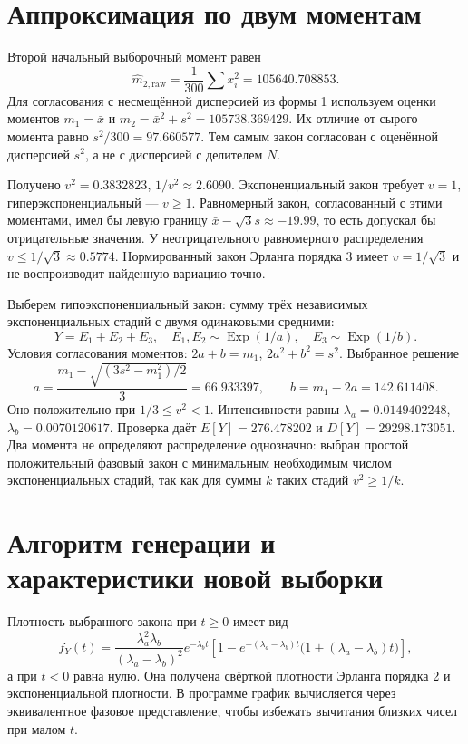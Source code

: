 \documentclass[11pt,a4paper]{article}
\begin{document}
\section{Аппроксимация по двум моментам}
Второй начальный выборочный момент равен
\[
\widehat m_{2,\mathrm{raw}}=\frac1{300}\sum x_i^2=105640.708853.
\]
Для согласования с несмещённой дисперсией из формы 1 используем оценки моментов $m_1=\bar x$ и $m_2=\bar x^2+s^2=105738.369429$. Их отличие от сырого момента равно $s^2/300=97.660577$. Тем самым закон согласован с оценённой дисперсией $s^2$, а не с дисперсией с делителем $N$.

Получено $v^2=0.3832823$, $1/v^2\approx2.6090$. Экспоненциальный закон требует $v=1$, гиперэкспоненциальный --- $v\geq1$. Равномерный закон, согласованный с этими моментами, имел бы левую границу $\bar x-\sqrt3s\approx-19.99$, то есть допускал бы отрицательные значения. У неотрицательного равномерного распределения $v\leq1/\sqrt3\approx0.5774$. Нормированный закон Эрланга порядка 3 имеет $v=1/\sqrt3$ и не воспроизводит найденную вариацию точно.

Выберем гипоэкспоненциальный закон: сумму трёх независимых экспоненциальных стадий с двумя одинаковыми средними:
\[
Y=E_1+E_2+E_3,\quad E_1,E_2\sim\operatorname{Exp}(1/a),\quad
E_3\sim\operatorname{Exp}(1/b).
\]
Условия согласования моментов: $2a+b=m_1$, $2a^2+b^2=s^2$. Выбранное решение
\begin{equation}
a=\frac{m_1-\sqrt{(3s^2-m_1^2)/2}}{3}=66.933397,\qquad
b=m_1-2a=142.611408.
\end{equation}
Оно положительно при $1/3\leq v^2<1$. Интенсивности равны $\lambda_a=0.0149402248$, $\lambda_b=0.0070120617$. Проверка даёт $E[Y]=276.478202$ и $D[Y]=29298.173051$. Два момента не определяют распределение однозначно: выбран простой положительный фазовый закон с минимальным необходимым числом экспоненциальных стадий, так как для суммы $k$ таких стадий $v^2\geq1/k$.

\section{Алгоритм генерации и характеристики новой выборки}
Плотность выбранного закона при $t\geq0$ имеет вид
\begin{equation}
f_Y(t)=\frac{\lambda_a^2\lambda_b}{(\lambda_a-\lambda_b)^2}
e^{-\lambda_b t}\left[1-e^{-(\lambda_a-\lambda_b)t}\bigl(1+(\lambda_a-\lambda_b)t\bigr)\right],
\end{equation}
а при $t<0$ равна нулю. Она получена свёрткой плотности Эрланга порядка 2 и экспоненциальной плотности. В программе график вычисляется через эквивалентное фазовое представление, чтобы избежать вычитания близких чисел при малом $t$.
\end{document}
